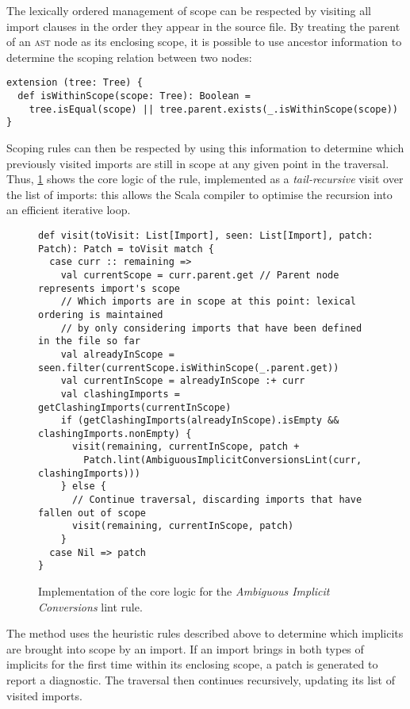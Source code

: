 \documentclass[../../main.tex]{subfiles}
\begin{document}
The lexically ordered management of scope can be respected by visiting all import clauses in the order they appear in the source file.
By treating the parent of an \textsc{ast} node as its enclosing scope, it is possible to use ancestor information to determine the scoping relation between two nodes:
\begin{verbatim}
extension (tree: Tree) {
  def isWithinScope(scope: Tree): Boolean =
    tree.isEqual(scope) || tree.parent.exists(_.isWithinScope(scope))
}
\end{verbatim}
%
Scoping rules can then be respected by using this information to determine which previously visited imports are still in scope at any given point in the traversal.
Thus, \cref{fig:ambiguous-implicits-impl} shows the core logic of the rule, implemented as a \emph{tail-recursive} visit over the list of imports: this allows the Scala compiler to optimise the recursion into an efficient iterative loop.
%
\begin{figure}[!hb]
\begin{verbatim}
def visit(toVisit: List[Import], seen: List[Import], patch: Patch): Patch = toVisit match {
  case curr :: remaining =>
    val currentScope = curr.parent.get // Parent node represents import's scope
    // Which imports are in scope at this point: lexical ordering is maintained
    // by only considering imports that have been defined in the file so far
    val alreadyInScope = seen.filter(currentScope.isWithinScope(_.parent.get))
    val currentInScope = alreadyInScope :+ curr
    val clashingImports = getClashingImports(currentInScope)
    if (getClashingImports(alreadyInScope).isEmpty && clashingImports.nonEmpty) {
      visit(remaining, currentInScope, patch +
        Patch.lint(AmbiguousImplicitConversionsLint(curr, clashingImports)))
    } else {
      // Continue traversal, discarding imports that have fallen out of scope
      visit(remaining, currentInScope, patch)
    }
  case Nil => patch
}
\end{verbatim}
\caption{Implementation of the core logic for the \emph{Ambiguous Implicit Conversions} lint rule.}
\label{fig:ambiguous-implicits-impl}
\end{figure}
%
The  method uses the heuristic rules described above to determine which implicits are brought into scope by an import.
If an import brings in both types of implicits for the first time within its enclosing scope, a patch is generated to report a diagnostic.
The traversal then continues recursively, updating its list of visited imports.
\end{document}
